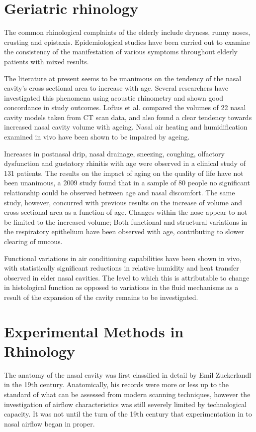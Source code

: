 
\section{Geriatric rhinology}
The common rhinological complaints of the elderly include dryness, runny noses, crusting and epistaxis\cite{Varga-Huettner2013}. Epidemiological studies have been carried out to examine the consistency of the manifestation of various symptoms throughout elderly patients with mixed results. 

The literature at present seems to be unanimous on the tendency of the nasal cavity's cross sectional area to increase with age. Several researchers have investigated this phenomena using acoustic rhinometry and shown good concordance in study outcomes\cite{Kalmovich2005, Edelstein1996,WhanKim2007,Lindemann2008}. Loftus et al. \cite{Loftus2016} compared the volumes of 22 nasal cavity models taken from CT scan data, and also found a clear tendency towards increased nasal cavity volume with ageing. Nasal air heating and humidification examined in vivo have been shown to be impaired by ageing\cite{Lindemann2008}. 

Increases in postnasal drip, nasal drainage, sneezing, coughing, olfactory dysfunction and gustatory rhinitis with age were observed in a clinical study of 131 patients\cite{Edelstein1996}. The results on the impact of aging on the quality of life have not been unanimous, a 2009 study found that in a sample of 80 people no significant relationship could be observed between age and nasal discomfort\cite{Lindemann2010}. The same study, however, concurred with previous results on the increase of volume and cross sectional area as a function of age. Changes within the nose appear to not be limited to the increased volume; Both functional and structural variations in the respiratory epithelium have been observed with age, contributing to slower clearing of mucous\cite{HO2001}. 

Functional variations in air conditioning capabilities have been shown in vivo\cite{Lindemann2008}, with statistically significant reductions in relative humidity and heat transfer observed in elder nasal cavities. The level to which this is attributable to change in histological function as opposed to variations in the fluid mechanisms as a result of the expansion of the cavity remains to be investigated.

 \section{Experimental Methods in Rhinology}
The anatomy of the nasal cavity was first classified in detail by Emil Zuckerlandl in the 19th century\cite{Stammberger1989}. Anatomically, his records were more or less up to the standard of what can be assessed from modern scanning techniques\cite{Stammberger1989}, however the investigation of airflow characteristics was still severely limited by technological capacity\cite{Eccles2000}. It was not until the turn of the 19th century that experimentation in to nasal airflow began in proper\cite{Eccles2000}. 

